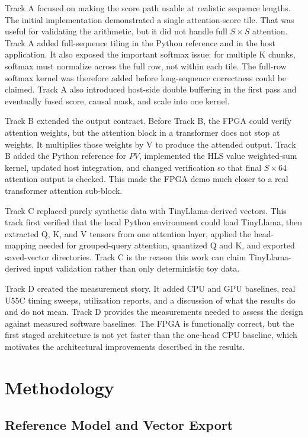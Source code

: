 \documentclass[conference]{IMSTemplate}
\begin{document}
Track A focused on making the score path usable at realistic sequence lengths.
The initial implementation demonstrated a single attention-score tile. That was
useful for validating the arithmetic, but it did not handle full \(S\times S\)
attention. Track A added full-sequence tiling in the Python reference and in
the host application. It also exposed the important softmax issue: for multiple
K chunks, softmax must normalize across the full row, not within each tile. The
full-row softmax kernel was therefore added before long-sequence correctness
could be claimed. Track A also introduced host-side double buffering in the
first pass and eventually fused score, causal mask, and scale into one kernel.

Track B extended the output contract. Before Track B, the FPGA could verify
attention weights, but the attention block in a transformer does not stop at
weights. It multiplies those weights by V to produce the attended output. Track
B added the Python reference for \(PV\), implemented the HLS
value weighted-sum kernel, updated host integration, and changed verification
so that final \(S\times64\) attention output is checked. This made the FPGA
demo much closer to a real transformer attention sub-block.

Track C replaced purely synthetic data with TinyLlama-derived vectors. This
track first verified that the local Python environment could load TinyLlama,
then extracted Q, K, and V tensors from one attention layer, applied the
head-mapping needed for grouped-query attention, quantized Q and K, and exported
saved-vector directories. Track C is the reason this work can claim
TinyLlama-derived input validation rather than only deterministic toy data.

Track D created the measurement story. It added CPU and GPU baselines, real U55C
timing sweeps, utilization reports, and a discussion of what the results do and
do not mean. Track D provides the measurements needed to assess the design against measured software baselines. The FPGA is functionally correct, but the first staged
architecture is not yet faster than the one-head CPU baseline, which motivates the architectural improvements described in the results.

\section{Methodology}

\subsection{Reference Model and Vector Export}
\end{document}
